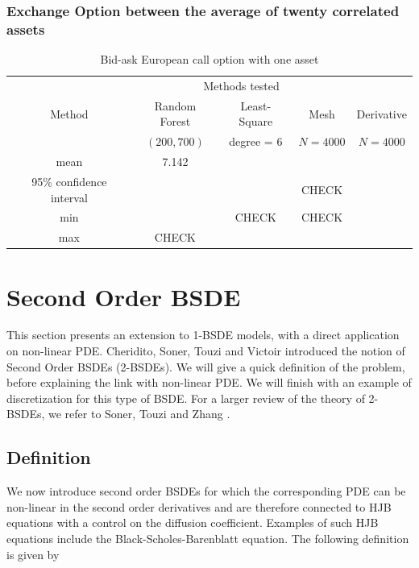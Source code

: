 \documentclass[english,11pt,openany]{article}
\theoremstyle{definition}
\theoremstyle{plain}
\theoremstyle{definition}
\begin{document}
	\subsubsection{Exchange Option between the average of twenty correlated assets}
	
	\begin{table}[!h]
		\centering
		\caption{Bid-ask European call option with one asset}\label{table:1}
		\begin{tabular}{*5c}
			\toprule
			& \multicolumn{3}{c}{Methods tested} \\
			\cmidrule(lr){2-4}
			Method & Random Forest  & Least-Square & Mesh & Derivative \\    
			& $(200, 700)$ & degree = $6$     & $N = 4 000$ &  $N = 4 000$ \\
			\midrule
			mean &     7.142   &  &       \\ 
			95\% confidence interval &        &        & CHECK \\
			min &        & CHECK & CHECK \\
			max & CHECK &        &        \\
			\bottomrule
		\end{tabular}
	\end{table}
	
	\newpage
	
	
	
	\section{Second Order BSDE}
	
	This section presents an extension to 1-BSDE models, with a direct application on non-linear PDE.
	Cheridito, Soner, Touzi and Victoir \cite{cheridito:2BSDE} introduced the notion of Second Order BSDEs (2-BSDEs).
	\newline
	We will give a quick definition of the problem, before explaining the link with non-linear PDE. We will finish with an example of discretization for this type of BSDE. 
	For a larger review of the theory of 2-BSDEs, we refer to Soner, Touzi and Zhang \cite{touzi:2BSDE}.
	
	\subsection{Definition}
	
	We now introduce second
	order BSDEs for which the corresponding PDE can be non-linear in the second
	order derivatives and are therefore connected to HJB equations with a control on the diffusion coefficient. Examples of such HJB equations include the
	Black-Scholes-Barenblatt equation.
	The following definition is given by \cite{cheridito:2BSDE}
	
\end{document}

